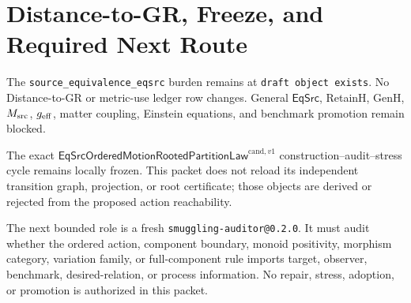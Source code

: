 \documentclass[11pt]{article}
\begin{document}
\section{Distance-to-GR, Freeze, and Required Next Route}

The \texttt{source\_equivalence\_eqsrc} burden remains at
\texttt{draft object exists}. No Distance-to-GR or metric-use ledger row
changes. General \(\mathsf{EqSrc}\), RetainH, GenH, \(M_{\rm src}\),
\(g_{\rm eff}\), matter coupling, Einstein equations, and benchmark promotion
remain blocked.

The exact \(\mathsf{EqSrcOrderedMotionRootedPartitionLaw}^{\mathrm{cand},v1}\)
construction--audit--stress cycle remains locally frozen. This packet does
not reload its independent transition graph, projection, or root certificate;
those objects are derived or rejected from the proposed action reachability.

The next bounded role is a fresh \texttt{smuggling-auditor@0.2.0}. It must
audit whether the ordered action, component boundary, monoid positivity,
morphism category, variation family, or full-component rule imports target,
observer, benchmark, desired-relation, or process information. No repair,
stress, adoption, or promotion is authorized in this packet.
\end{document}
